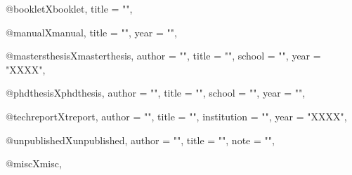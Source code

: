 @booklet{Xbooklet,
    title           = "",
}

@manual{Xmanual,
	title		    = "",
	year	    	= "",
}

@mastersthesis{Xmasterthesis,
    author          = "",
    title           = "",
    school          = "",
    year            = "XXXX",
}

@phdthesis{Xphdthesis,
	author          = "",
	title           = "",
	school          = "",
	year            = "",
}

@techreport{Xtreport,
    author          = "",
    title           = "",
    institution     = "",
    year            = "XXXX",
}

@unpublished{Xunpublished,
	author          = "",
	title           = "",
	note            = "",
}

@misc{Xmisc,
}
